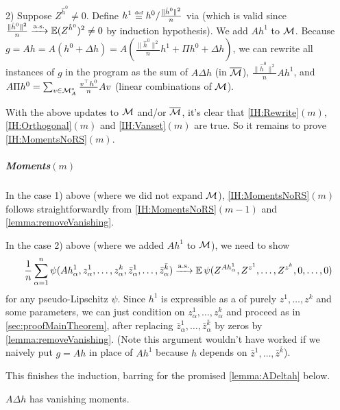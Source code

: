 \documentclass[main.tex]{subfiles}
\begin{document}
2) Suppose $Z^{\hat{h}^{0}}\ne0$. Define $h^{1}\defeq h^{0}/\frac{\|\hat{h}^{0}\|^{2}}{n}$ via  (which is valid since $\frac{\|\hat{h}^{0}\|^{2}}{n}\xrightarrow{\mathrm{a.s.}}\operatorname*{\mathbb{E}}(Z^{\hat{h}^{0}})^{2}\ne0$ by induction hypothesis). We add $Ah^{1}$ to $\mathcal{M}$. Because $g=Ah=A(h^{0}+\Delta h)=A(\frac{\|\hat{h}^{0}\|^{2}}{n}h^{1}+\Pi h^{0}+\Delta h)$, we can rewrite all instances of $g$ in the program as the sum of $A\Delta h$ (in $\overline{\mathcal{M}}$), $\frac{\|\hat{h}^{0}\|^{2}}{n}Ah^{1}$, and $A\Pi h^{0}=\sum_{v\in\mathcal{M}_{A}^{*}}\frac{v^{\top}h^{0}}{n}Av$ (linear combinations of $\mathcal{M}$).

With the above updates to $\mathcal{M}$ and/or $\overline{\mathcal{M}}$, it's clear that \ref{IH:Rewrite}$(m)$, \ref{IH:Orthogonal}$(m)$ and \ref{IH:Vanset}$(m)$ are true. So it remains to prove \ref{IH:MomentsNoRS}$(m)$.

\subparagraph*{Moments$(m)$}

In the case 1) above (where we did not expand $\mathcal{M}$), \ref{IH:MomentsNoRS}$(m)$ follows straightforwardly from \ref{IH:MomentsNoRS}$(m-1)$ and \cref{lemma:removeVanishing}.

In the case 2) above (where we added $Ah^{1}$ to $\mathcal{M}$), we need to show
\[
\frac{1}{n}\sum_{\alpha=1}^{n}\psi(Ah_{\alpha}^{1},z_{\alpha}^{1},\ldots,z_{\alpha}^{k},\bar{z}_{\alpha}^{1},\ldots,\bar{z}_{\alpha}^{\bar{k}})\xrightarrow{\mathrm{a.s.}}\operatorname*{\mathbb{E}}\psi(Z^{Ah_{\alpha}^{1}},Z^{z^{1}},\ldots,Z^{z^{k}},0,\ldots,0)
\]
for any pseudo-Lipschitz $\psi$. Since $h^{1}$ is expressible as a  of purely $z^{1},\ldots,z^{k}$ and some parameters, we can just condition on $z_{\alpha}^{1},\ldots,z_{\alpha}^{k}$ and proceed as in \cref{sec:proofMainTheorem}, after replacing $\bar{z}_{\alpha}^{1},\ldots,\bar{z}_{\alpha}^{\bar{k}}$ by zeros by \cref{lemma:removeVanishing}. (Note this argument wouldn't have worked if we naively put $g=Ah$ in place of $Ah^{1}$ because $h$ depends on $\bar{z}^{1},\ldots,\bar{z}^{\bar{k}}$).

This finishes the induction, barring for the promised \cref{lemma:ADeltah} below.

\begin{lemma}
\label{lemma:ADeltah}$A\Delta h$ has vanishing moments.
\end{lemma}
\end{document}
